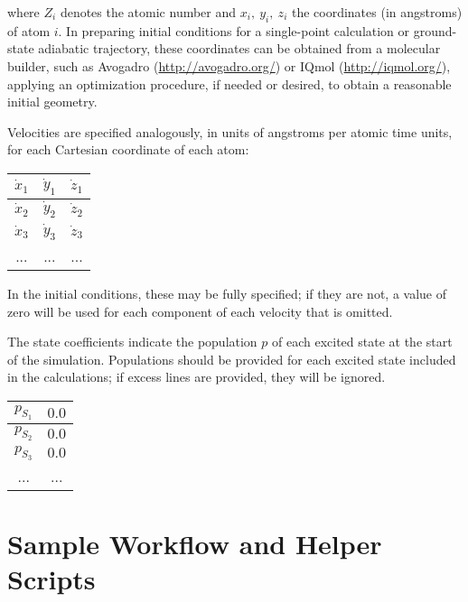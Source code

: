 \documentclass[12pt,letter,footinclude=true,headinclude=true,hyphens,oneside]{book} %
\begin{document}
    where $Z_i$ denotes the atomic number and $x_i,\ y_i,\ z_i$ the coordinates (in angstroms) of atom $i$. In preparing initial conditions for a single-point calculation or ground-state adiabatic trajectory, these coordinates can be obtained from a molecular builder, such as Avogadro (\url{http://avogadro.org/}) or IQmol (\url{http://iqmol.org/}), applying an optimization procedure, if needed or desired, to obtain a reasonable initial geometry.
    
    Velocities are specified analogously, in units of angstroms per atomic time units, for each Cartesian coordinate of each atom:
    
    \begin{center}
    \begin{tabular}{ | c | c | c | } \hline
    $\dot{x}_1$ & $\dot{y}_1$ & $\dot{z}_1$ \\ \hline
    $\dot{x}_2$ & $\dot{y}_2$ & $\dot{z}_2$ \\ \hline
    $\dot{x}_3$ & $\dot{y}_3$ & $\dot{z}_3$ \\ \hline
    ... & ... & ... \\ \hline
    \end{tabular}
    \end{center}
    
    In the initial conditions, these may be fully specified; if they are not, a value of zero will be used for each component of each velocity that is omitted.
    
    The state coefficients indicate the population $p$ of each excited state at the start of the simulation. Populations should be provided for each excited state included in the calculations; if excess lines are provided, they will be ignored.
    
    \begin{center}
    \begin{tabular}{ | c | c | } \hline
    $p_{S_1}$ & $0.0$ \\ \hline
    $p_{S_2}$ & $0.0$ \\ \hline
    $p_{S_3}$ & $0.0$ \\ \hline
    ... & ... \\ \hline
    \end{tabular}
    \end{center}
    
%	

    \appendix
    
    \chapter{Sample Workflow and Helper Scripts}
    
\end{document}
